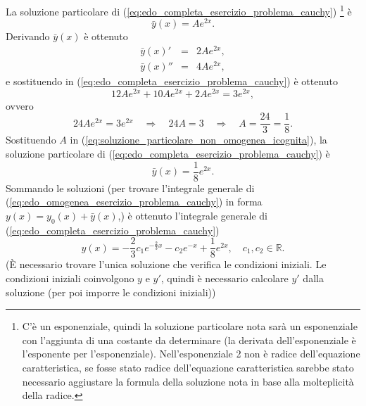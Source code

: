 \begin{example}
\begin{equation*}
	\end{equation*}
	La soluzione particolare di (\ref{eq:edo_completa_esercizio_problema_cauchy}) \footnote{C'è un esponenziale, quindi la soluzione particolare nota sarà un esponenziale con l'aggiunta di una costante da determinare (la derivata dell'esponenziale è l'esponente per l'esponenziale). Nell'esponenziale 2 non è radice dell'equazione caratteristica, se fosse stato radice dell'equazione caratteristica sarebbe stato necessario aggiustare la formula della soluzione nota in base alla molteplicità della radice.} è
	\begin{equation}\label{eq:soluzione_particolare_non_omogenea_icognita}
		\bar y(x) = A e^{2x}.
	\end{equation}
	Derivando $\bar y(x)$ è ottenuto
	\begin{equation*}
		\begin{matrix}
			\bar y(x)' &=& 2 Ae^{2x},\\
			\bar y(x)'' &=& 4Ae^{2x},
		\end{matrix}
	\end{equation*}
	e sostituendo in (\ref{eq:edo_completa_esercizio_problema_cauchy}) è ottenuto
	\begin{equation*}
		12 Ae^{2x} +10 A e^{2x} + 2Ae^{2x} = 3 e^{2x},
	\end{equation*}
	ovvero
	\begin{equation*}
		24 A e^{2x} = 3 e^{2x}\quad\Rightarrow\quad 24 A  = 3 \quad\Rightarrow\quad A=\frac{24}{3} = \frac{1}{8}.
	\end{equation*}
	Sostituendo $A$ in (\ref{eq:soluzione_particolare_non_omogenea_icognita}), la soluzione particolare di (\ref{eq:edo_completa_esercizio_problema_cauchy}) è
	\begin{equation*}
		\bar y(x) = \frac{1}{8} e^{2x}.
	\end{equation*}
	Sommando le soluzioni (per trovare l'integrale generale di (\ref{eq:edo_omogenea_esercizio_problema_cauchy}) in forma $y(x) = y_0(x) + \bar y(x)$,) è ottenuto l'integrale generale di (\ref{eq:edo_completa_esercizio_problema_cauchy})
	\begin{equation*}
		y(x)  = -\frac{2}{3} c_1 e^{-\frac{2}{3}x}-c_2 e^{-x}+\frac{1}{8}e^{2x},\quad c_1,c_2\in\mathbb{R}.
	\end{equation*}
	(È necessario trovare l'unica soluzione che verifica le condizioni iniziali. Le condizioni iniziali coinvolgono $y$ e $y'$, quindi è necessario calcolare $y'$ dalla soluzione (per poi imporre le condizioni iniziali))
	\begin{equation*}

\end{equation*}
\end{example}
